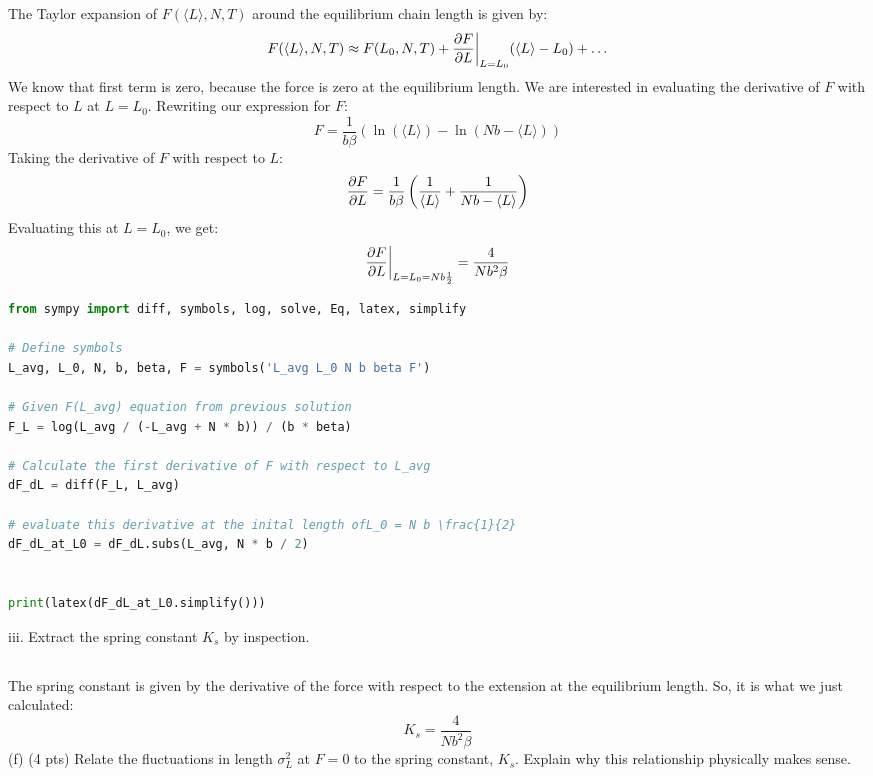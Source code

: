 \documentclass[12pt]{article}
\begin{document}
\subsubsection{}
The Taylor expansion of $F(\langle L\rangle, N, T)$ around the equilibrium chain length is given by:
\begin{equation}
  F(\langle L\rangle, N, T) \approx F(L_0, N, T) + \pdv{F}{L} \bigg|_{L=L_0} (\langle L\rangle - L_0) + \ldots
\end{equation}
We know that first term is zero, because the force is zero at the equilibrium length. We are interested in evaluating the derivative of $F$ with respect to $L$ at $L=L_0$. Rewriting our expression for $F$:
\begin{equation}
  F = \frac{1}{b\beta }\left( \ln (\langle L \rangle) - \ln (N b - \langle L \rangle) \right)
\end{equation}
Taking the derivative of $F$ with respect to $L$:
\begin{equation}
  \pdv{F}{L} = \frac{1}{b\beta }\left( \frac{1}{\langle L \rangle} + \frac{1}{N b - \langle L \rangle} \right)
\end{equation}
Evaluating this at $L=L_0$, we get:
\begin{equation}
  \pdv{F}{L} \bigg|_{L=L_0= N b \frac{1}{2}} = \frac{4}{N b^{2} \beta}
\end{equation} 
\begin{lstlisting}[language=Python]
from sympy import diff, symbols, log, solve, Eq, latex, simplify

# Define symbols
L_avg, L_0, N, b, beta, F = symbols('L_avg L_0 N b beta F')

# Given F(L_avg) equation from previous solution
F_L = log(L_avg / (-L_avg + N * b)) / (b * beta)

# Calculate the first derivative of F with respect to L_avg
dF_dL = diff(F_L, L_avg)

# evaluate this derivative at the inital length ofL_0 = N b \frac{1}{2}
dF_dL_at_L0 = dF_dL.subs(L_avg, N * b / 2)


print(latex(dF_dL_at_L0.simplify()))
\end{lstlisting}

iii. Extract the spring constant $K_{s}$ by inspection.
\subsection{}
The spring constant is given by the derivative of the force with respect to the extension at the equilibrium length. So, it is what we just calculated:
\begin{equation}
  K_{s} = \frac{4}{N b^{2} \beta}
\end{equation}
(f) (4 pts) Relate the fluctuations in length $\sigma_{L}^{2}$ at $F=0$ to the spring constant, $K_{s}$. Explain why this relationship physically makes sense.
\end{document}
